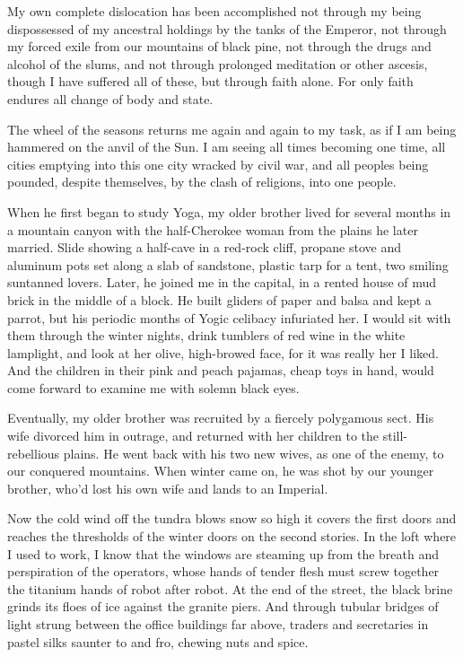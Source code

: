 \documentclass[english,11pt,letterpaper,onecolumn,parskip=full]{scrbook}
\begin{document}
	My own complete dislocation has been accomplished not through my being dispossessed of my ancestral holdings by the tanks of the Emperor, not through my forced exile from our mountains of black pine, not through the drugs and alcohol of the slums, and not through prolonged meditation or other ascesis, though I have suffered all of these, but through faith alone.  For only faith endures all change of body and state.

	The wheel of the seasons returns me again and again to my task, as if I am being hammered on the anvil of the Sun.  I am seeing all times becoming one time, all cities emptying into this one city wracked by civil war, and all peoples being pounded, despite themselves, by the clash of religions, into one people.

	When he first began to study Yoga, my older brother lived for several months in a mountain canyon with the half-Cherokee woman from the plains he later married.  Slide showing a half-cave in a red-rock cliff, propane stove and aluminum pots set along a slab of sandstone, plastic tarp for a tent, two smiling suntanned lovers.  Later, he joined me in the capital, in a rented house of mud brick in the middle of a block.  He built gliders of paper and balsa and kept a parrot, but his periodic months of Yogic celibacy infuriated her.  I would sit with them through the winter nights, drink tumblers of red wine in the white lamplight, and look at her olive, high-browed face, for it was really her I liked.  And the children in their pink and peach pajamas, cheap toys in hand, would come forward to examine me with solemn black eyes.

	Eventually, my older brother was recruited by a fiercely polygamous sect.  His wife divorced him in outrage, and returned with her children to the still-rebellious plains.  He went back with his two new wives, as one of the enemy, to our conquered mountains.  When winter came on, he was shot by our younger brother, who'd lost his own wife and lands to an Imperial.

	Now the cold wind off the tundra blows snow so high it covers the first doors and reaches the thresholds of the winter doors on the second stories.  In the loft where I used to work, I know that the windows are steaming up from the breath and perspiration of the operators, whose hands of tender flesh must screw together the titanium hands of robot after robot.  At the end of the street, the black brine grinds its floes of ice against the granite piers.  And through tubular bridges of light strung between the office buildings far above, traders and secretaries in pastel silks saunter to and fro, chewing nuts and spice.
\end{document}
